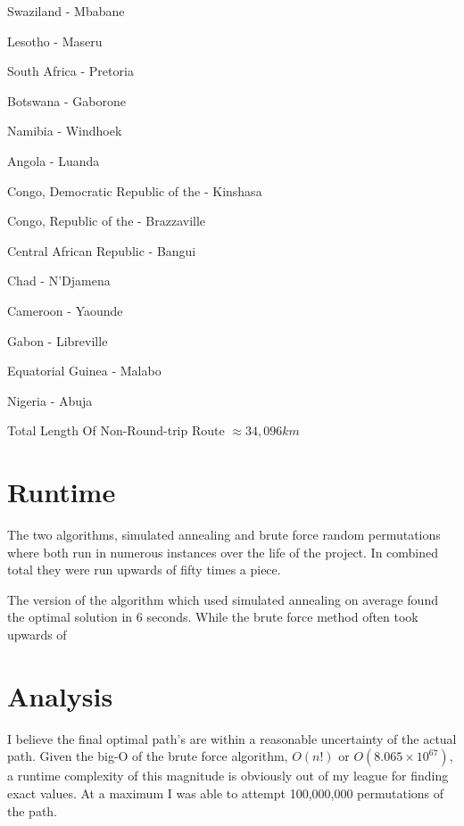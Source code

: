 \documentclass[12pt]{article}
\begin{document}
\begin{multicols}{3}
\begin{enumerate*}
\item Swaziland - Mbabane
\item Lesotho - Maseru
\item South Africa - Pretoria 
\item Botswana - Gaborone
\item Namibia - Windhoek
\item Angola - Luanda
\item Congo, Democratic Republic of the - Kinshasa
\item Congo, Republic of the - Brazzaville
\item Central African Republic - Bangui
\item Chad - N'Djamena
\item Cameroon - Yaounde
\item Gabon - Libreville
\item Equatorial Guinea - Malabo
\item Nigeria - Abuja
\end{enumerate*}
\end{multicols}

Total Length Of Non-Round-trip Route $\approx 34,096 km$

\section{Runtime}

The two algorithms, simulated annealing and brute force random permutations where both run in numerous instances over the life of the project. 
In combined total they were run upwards of fifty times a piece.

The version of the algorithm which used simulated annealing on average found the optimal solution in 6 seconds. 
While the brute force method often took upwards of  

\section{Analysis}

I believe the final optimal path's are within a reasonable uncertainty of the actual path.
Given the big-O of the brute force algorithm, $O(n!)$ or $O( 8.065 \times 10^{67} )$, a runtime complexity of this magnitude is obviously out of my league for finding exact values.
At a maximum I was able to attempt 100,000,000 permutations of the path.
\end{document}

